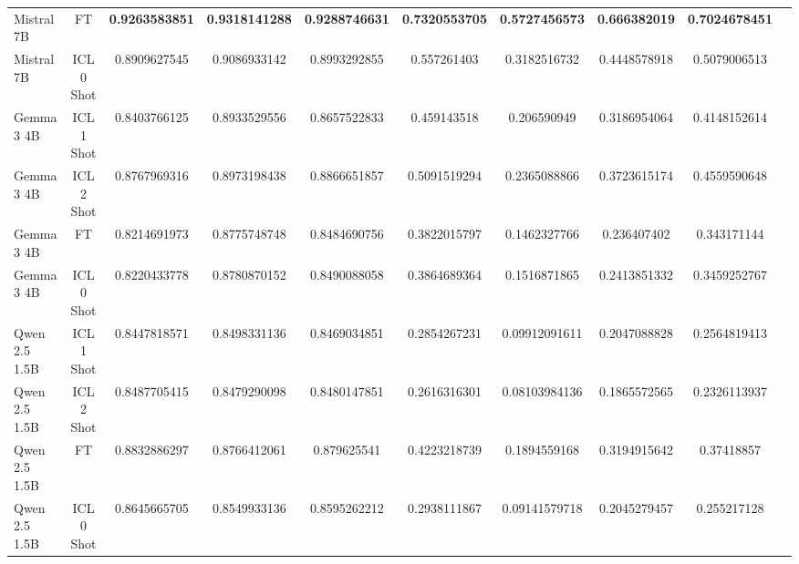 \begin{tabular}{lccccccccc}
Mistral 7B  & FT & \textbf{0.9263583851} & \textbf{0.9318141288} & \textbf{0.9288746631} & \textbf{0.7320553705} & \textbf{0.5727456573} & \textbf{0.666382019} & \textbf{0.7024678451} \\
Mistral 7B  & ICL 0 Shot & 0.8909627545 & 0.9086933142 & 0.8993292855 & 0.557261403 & 0.3182516732 & 0.4448578918 & 0.5079006513 \\
Gemma 3 4B & ICL 1 Shot & 0.8403766125 & 0.8933529556 & 0.8657522833 & 0.459143518 & 0.206590949 & 0.3186954064 & 0.4148152614 \\
Gemma 3 4B & ICL 2 Shot & 0.8767969316 & 0.8973198438 & 0.8866651857 & 0.5091519294 & 0.2365088866 & 0.3723615174 & 0.4559590648 \\
Gemma 3 4B & FT & 0.8214691973 & 0.8775748748 & 0.8484690756 & 0.3822015797 & 0.1462327766 & 0.236407402 & 0.343171144 \\
Gemma 3 4B & ICL 0 Shot & 0.8220433778 & 0.8780870152 & 0.8490088058 & 0.3864689364 & 0.1516871865 & 0.2413851332 & 0.3459252767 \\
Qwen 2.5 1.5B & ICL 1 Shot & 0.8447818571 & 0.8498331136 & 0.8469034851 & 0.2854267231 & 0.09912091611 & 0.2047088828 & 0.2564819413 \\
Qwen 2.5 1.5B & ICL 2 Shot & 0.8487705415 & 0.8479290098 & 0.8480147851 & 0.2616316301 & 0.08103984136 & 0.1865572565 & 0.2326113937 \\
Qwen 2.5 1.5B & FT & 0.8832886297 & 0.8766412061 & 0.879625541 & 0.4223218739 & 0.1894559168 & 0.3194915642 & 0.37418857 \\
Qwen 2.5 1.5B & ICL 0 Shot & 0.8645665705 & 0.8549933136 & 0.8595262212 & 0.2938111867 & 0.09141579718 & 0.2045279457 & 0.255217128 \\
\bottomrule
\end{tabular}

